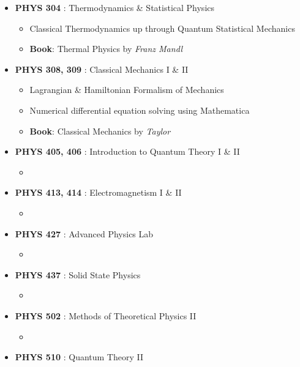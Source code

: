 \documentclass[10pt,a4paper,ragged2e]{altacv}
\begin{document}
\clearpage
\nocite{*}
\begin{itemize}
\item \textbf{PHYS 304} : Thermodynamics \& Statistical Physics
  \begin{itemize}
  \item Classical Thermodynamics up through Quantum Statistical Mechanics
  \item \textbf{Book}: Thermal Physics by \textit{Franz Mandl}
  \end{itemize}
\item \textbf{PHYS 308, 309} : Classical Mechanics I \& II
  \begin{itemize}
  \item Lagrangian \& Hamiltonian Formalism of Mechanics
  \item Numerical differential equation solving using Mathematica
\item \textbf{Book}: Classical Mechanics by \textit{Taylor} 
  \end{itemize}
\item \textbf{PHYS 405, 406} : Introduction to Quantum Theory I \& II
  \begin{itemize}
  \item 
  \end{itemize}
\item \textbf{PHYS 413, 414} : Electromagnetism I \& II
  \begin{itemize}
  \item 
  \end{itemize}
\item \textbf{PHYS 427} : Advanced Physics Lab
  \begin{itemize}
  \item 
  \end{itemize}
\item \textbf{PHYS 437} : Solid State Physics
  \begin{itemize}
  \item 
  \end{itemize}
\item \textbf{PHYS 502} : Methods of Theoretical Physics II
  \begin{itemize}
  \item 
  \end{itemize}
\item \textbf{PHYS 510} : Quantum Theory II
  \begin{itemize}

\end{itemize}
\end{itemize}
\end{document}
